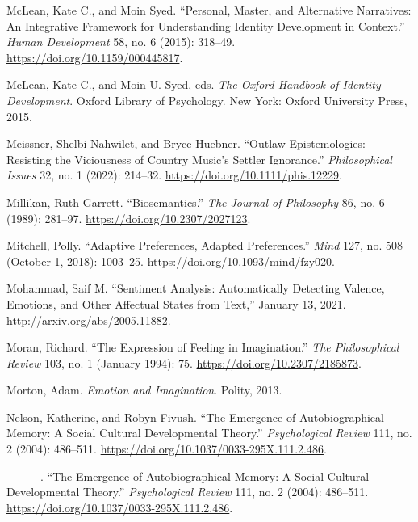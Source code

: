 \documentclass[
  12pt,
]{book}
\newlength{\cslhangindent}
\newenvironment{CSLReferences}[2] %
 {\begin{list}{}{%
  \setlength{\itemindent}{0pt}
  \setlength{\leftmargin}{0pt}
  \setlength{\parsep}{0pt}
  \ifodd #1
   \setlength{\leftmargin}{\cslhangindent}
   \setlength{\itemindent}{-1\cslhangindent}
  \fi
  \setlength{\itemsep}{#2\baselineskip}}}
 {\end{list}}
\theoremstyle{definition}
\theoremstyle{definition}
\theoremstyle{definition}
\theoremstyle{definition}
\theoremstyle{remark}
\begin{document}
\begin{CSLReferences}{1}{0}
McLean, Kate C., and Moin Syed. {``Personal, {Master}, and {Alternative Narratives}: {An Integrative Framework} for {Understanding Identity Development} in {Context}.''} \emph{Human Development} 58, no. 6 (2015): 318--49. \url{https://doi.org/10.1159/000445817}.

McLean, Kate C., and Moin U. Syed, eds. \emph{The {Oxford} Handbook of Identity Development}. Oxford Library of Psychology. New York: Oxford University Press, 2015.

Meissner, Shelbi Nahwilet, and Bryce Huebner. {``Outlaw Epistemologies: {Resisting} the Viciousness of Country Music's Settler Ignorance.''} \emph{Philosophical Issues} 32, no. 1 (2022): 214--32. \url{https://doi.org/10.1111/phis.12229}.

Millikan, Ruth Garrett. {``Biosemantics.''} \emph{The Journal of Philosophy} 86, no. 6 (1989): 281--97. \url{https://doi.org/10.2307/2027123}.

Mitchell, Polly. {``Adaptive {Preferences}, {Adapted Preferences}.''} \emph{Mind} 127, no. 508 (October 1, 2018): 1003--25. \url{https://doi.org/10.1093/mind/fzy020}.

Mohammad, Saif M. {``Sentiment {Analysis}: {Automatically Detecting Valence}, {Emotions}, and {Other Affectual States} from {Text},''} January 13, 2021. \url{http://arxiv.org/abs/2005.11882}.

Moran, Richard. {``The {Expression} of {Feeling} in {Imagination}.''} \emph{The Philosophical Review} 103, no. 1 (January 1994): 75. \url{https://doi.org/10.2307/2185873}.

Morton, Adam. \emph{Emotion and {Imagination}}. Polity, 2013.

Nelson, Katherine, and Robyn Fivush. {``The {Emergence} of {Autobiographical Memory}: {A Social Cultural Developmental Theory}.''} \emph{Psychological Review} 111, no. 2 (2004): 486--511. \url{https://doi.org/10.1037/0033-295X.111.2.486}.

---------. {``The {Emergence} of {Autobiographical Memory}: {A Social Cultural Developmental Theory}.''} \emph{Psychological Review} 111, no. 2 (2004): 486--511. \url{https://doi.org/10.1037/0033-295X.111.2.486}.


\end{CSLReferences}
\end{document}
